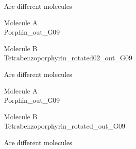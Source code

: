 \begin{center}
\vtab
\vtab
\textcolor{NavyBlue}{\large Are different molecules}
\end{center}
\newpage
\begin{multicols}{2}
\begin{center}
Molecule A \\ 
Porphin\_out\_G09
\vtab

\columnbreak

Molecule B \\ 
Tetrabenzoporphyrin\_rotated02\_out\_G09
\vtab
\end{center}
\end{multicols}
\begin{center}
\vtab
\vtab
\textcolor{NavyBlue}{\large Are different molecules}
\end{center}
\newpage
\begin{multicols}{2}
\begin{center}
Molecule A \\ 
Porphin\_out\_G09
\vtab

\columnbreak

Molecule B \\ 
Tetrabenzoporphyrin\_rotated\_out\_G09
\vtab
\end{center}
\end{multicols}
\begin{center}
\vtab
\vtab
\textcolor{NavyBlue}{\large Are different molecules}
\end{center}
\newpage
